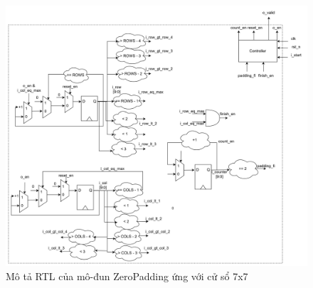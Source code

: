 \begin{figure}[!ht]
    \centering
    \includegraphics[width=\linewidth]{figures/zero7x7Architecture1.png}
    \caption{Mô tả RTL của mô-đun ZeroPadding ứng với cử sổ 7x7}
    \label{fig:zero7x7Architecture1}
\end{figure}

\renewcommand{\arraystretch}{1}


